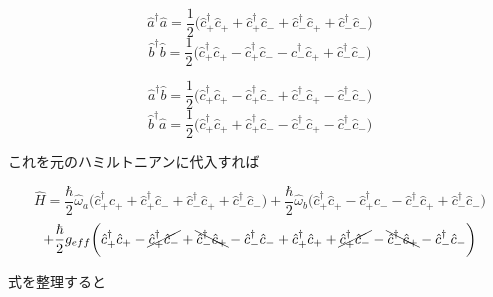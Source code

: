 \begin{equation}
    \hat{a}^{\dagger} \hat{a}=\frac{1}{2}\biggl(\hat{c}_{+}^{\dagger} \hat{c}_{+}+\hat{c}_{+}^{\dagger} \hat{c}_{-}+\hat{c}_{-}^{\dagger} \hat{c}_{+}+\hat{c}_{-}^{\dagger} \hat{c}_{-}\biggr)
\end{equation}
\begin{equation}
    \hat{b}^{\dagger} \hat{b}=\frac{1}{2}\biggl(\hat{c}_{+}^{\dagger} \hat{c}_{+}-\hat{c}_{+}^{\dagger} \hat{c}_{-}-\hat{c}_{-}^{\dagger} \hat{c}_{+}+\hat{c}_{-}^{\dagger} \hat{c}_{-}\biggr)
\end{equation}

\begin{equation}
    \hat{a}^{\dagger} \hat{b}=\frac{1}{2}\biggl(\hat{c}_{+}^{\dagger}\hat{c}_{+}-\hat{c}_{+}^{\dagger} \hat{c}_{-}+\hat{c}_{-}^{\dagger} \hat{c}_{+}-\hat{c}_{-}^{\dagger} \hat{c}_{-}\biggr)
\end{equation}
\begin{equation}
    \hat{b}^{\dagger}\hat{a} =\frac{1}{2}\biggl(\hat{c}_{+}^{\dagger}\hat{c}_{+} +\hat{c}_{+}^{\dagger}\hat{c}_{-} - \hat{c}_{-}^{\dagger}\hat{c}_{+}-\hat{c}_{-}^{\dagger}\hat{c}_{-}\biggr)
\end{equation}

これを元のハミルトニアンに代入すれば

\begin{equation}
    \hat{H}=\frac{\hbar}{2} \hat{\omega}_{a}\biggl(\hat{c}_{+}^{\dagger} \hat{c}_{+}+\hat{c}_{+}^{\dagger} \hat{c}_{-}+\hat{c}_{-}^{\dagger} \hat{c}_{+}+\hat{c}_{-}^{\dagger} \hat{c}_{-}\biggr)+\frac{\hbar}{2} \hat{\omega}_{b}\biggl(\hat{c}_{+}^{\dagger} \hat{c}_{+}-\hat{c}_{+}^{\dagger} \hat{c}_{-}-\hat{c}_{-}^{\dagger} \hat{c}_{+}+\hat{c}_{-}^{\dagger} \hat{c}_{-}\biggr)
\end{equation}
\begin{equation}
    +\frac{\hbar}{2} g_{eff}\biggl(\hat{c}_{+}^{\dagger}\hat{c}_{+}-\cancel{\hat{c}_{+}^{\dagger} \hat{c}_{-}}+\bcancel{\hat{c}_{-}^{\dagger} \hat{c}_{+}}-\hat{c}_{-}^{\dagger} \hat{c}_{-}+\hat{c}_{+}^{\dagger}\hat{c}_{+} +\cancel{\hat{c}_{+}^{\dagger}\hat{c}_{-}} - \bcancel{\hat{c}_{-}^{\dagger}\hat{c}_{+}}-\hat{c}_{-}^{\dagger}\hat{c}_{-}\biggr)
\end{equation}

式を整理すると

